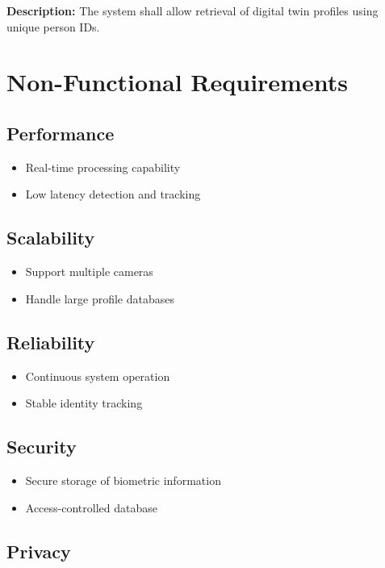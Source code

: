 \documentclass[12pt,a4paper]{article}
\begin{document}
\textbf{Description:}
The system shall allow retrieval of digital twin profiles using unique person IDs.

\section{Non-Functional Requirements}

\subsection{Performance}

\begin{itemize}
    \item Real-time processing capability
    \item Low latency detection and tracking
\end{itemize}

\subsection{Scalability}

\begin{itemize}
    \item Support multiple cameras
    \item Handle large profile databases
\end{itemize}

\subsection{Reliability}

\begin{itemize}
    \item Continuous system operation
    \item Stable identity tracking
\end{itemize}

\subsection{Security}

\begin{itemize}
    \item Secure storage of biometric information
    \item Access-controlled database
\end{itemize}

\subsection{Privacy}
\end{document}
